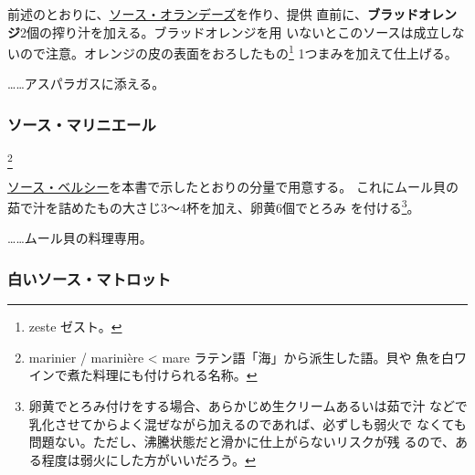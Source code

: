 \begin{recette}

前述のとおりに、\protect\hyperlink{sauce-hollandaise}{ソース・オランデーズ}を作り、提供
直前に、\textbf{ブラッドオレンジ}2個の搾り汁を加える。ブラッドオレンジを用
いないとこのソースは成立しないので注意。オレンジの皮の表面をおろしたもの\footnote{zeste
  ゼスト。} 1つまみを加えて仕上げる。

\ldots{}\ldots{}アスパラガスに添える。

\maeaki

\hypertarget{sauce-mariniere}{%
\subsubsection{ソース・マリニエール}\label{sauce-mariniere}}

\footnote{marinier / marinière \textless{} mare
  ラテン語「海」から派生した語。貝や
  魚を白ワインで煮た料理にも付けられる名称。}


\protect\hyperlink{sauce-bercy}{ソース・ベルシー}を本書で示したとおりの分量で用意する。
これにムール貝の茹で汁を詰めたもの大さじ3〜4杯を加え、卵黄6個でとろみ
を付ける\footnote{卵黄でとろみ付けをする場合、あらかじめ生クリームあるいは茹で汁
  などで乳化させてからよく混ぜながら加えるのであれば、必ずしも弱火で
  なくても問題ない。ただし、沸騰状態だと滑かに仕上がらないリスクが残
  るので、ある程度は弱火にした方がいいだろう。}。

\ldots{}\ldots{}ムール貝の料理専用。

\maeaki

\hypertarget{sauce-matelote-blanche}{%
\subsubsection{白いソース・マトロット}\label{sauce-matelote-blanche}}


\end{recette}
